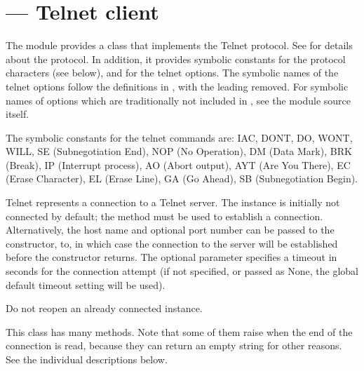 \section{ ---
         Telnet client}



The  module provides a  class that
implements the Telnet protocol.  See  for details about the
protocol. In addition, it provides symbolic constants for the protocol
characters (see below), and for the telnet options. The
symbolic names of the telnet options follow the definitions in
, with the leading  removed. For
symbolic names of options which are traditionally not included in
, see the module source itself.

The symbolic constants for the telnet commands are: IAC, DONT, DO,
WONT, WILL, SE (Subnegotiation End), NOP (No Operation), DM (Data
Mark), BRK (Break), IP (Interrupt process), AO (Abort output), AYT
(Are You There), EC (Erase Character), EL (Erase Line), GA (Go Ahead),
SB (Subnegotiation Begin).


\begin{classdesc}{Telnet}{}
 represents a connection to a Telnet server. The
instance is initially not connected by default; the 
method must be used to establish a connection.  Alternatively, the
host name and optional port number can be passed to the constructor,
to, in which case the connection to the server will be established
before the constructor returns.
The optional  parameter specifies a timeout in seconds for the
connection attempt (if not specified, or passed as None, the global default
timeout setting will be used).

Do not reopen an already connected instance.

This class has many  methods.  Note that some of them 
raise  when the end of the connection is read,
because they can return an empty string for other reasons.  See the
individual descriptions below.
\end{classdesc}


\begin{seealso}
\end{seealso}



